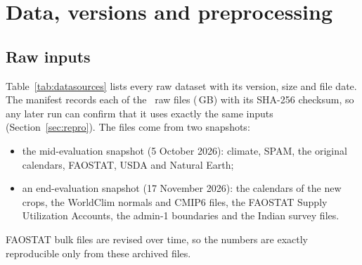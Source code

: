 \section{Data, versions and preprocessing}\label{sec:data}

\subsection{Raw inputs}
Table~\ref{tab:datasources} lists every raw dataset with its version, size and file date. The manifest
 records each of the \manifestFiles\ raw files (\manifestGB\,GB) with its SHA-256
checksum, so any later run can confirm that it uses exactly the same inputs (Section~\ref{sec:repro}). The files
come from two snapshots:
\begin{itemize}
\item the mid-evaluation snapshot (5 October 2026): climate, SPAM, the original calendars, FAOSTAT, USDA and
Natural Earth;
\item an end-evaluation snapshot (17 November 2026): the calendars of the new crops, the WorldClim normals and
CMIP6 files, the FAOSTAT Supply Utilization Accounts, the admin-1 boundaries and the Indian survey files.
\end{itemize}
FAOSTAT bulk files are revised over time, so the numbers are exactly reproducible only from these archived files.



